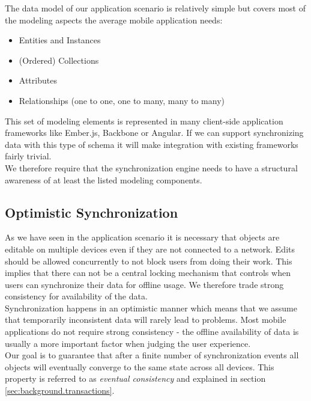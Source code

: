 The data model of our application scenario is relatively simple but covers most of the modeling aspects the average mobile application needs:

\begin{itemize}
\item Entities and Instances
\item (Ordered) Collections
\item Attributes
\item Relationships (one to one, one to many, many to many)
\end{itemize}

This set of modeling elements is represented in many client-side application frameworks like Ember.js, Backbone or Angular.
If we can support synchronizing data with this type of schema it will make integration with existing frameworks fairly trivial.\\
We therefore require that the synchronization engine needs to have a structural awareness of at least the listed modeling components.

\subsection{Optimistic Synchronization}
As we have seen in the application scenario it is necessary that objects are editable on multiple devices even if they are not connected to a network.
Edits should be allowed concurrently to not block users from doing their work.
This implies that there can not be a central locking mechanism that controls when users can synchronize their data for offline usage.
We therefore trade strong consistency for availability of the data.\\
Synchronization happens in an optimistic manner which means that we assume that temporarily inconsistent data will rarely lead to problems.
Most mobile applications do not require strong consistency - the offline availability of data is usually a more important factor when judging the user experience.\\
Our goal is to guarantee that after a finite number of synchronization events all objects will eventually converge to the same state across all devices.
This property is referred to as \emph{eventual consistency} and explained in section \ref{sec:background.transactions}.\\

